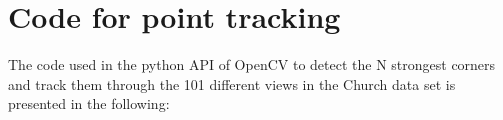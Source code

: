 \chapter{Code for point tracking}
\label{sec: Appendix A}

The code used in the python API of OpenCV to detect the N strongest corners and track them through the 101 different views in the Church data set is presented in the following:



